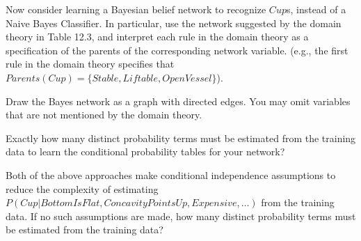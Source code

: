 \item 
Now consider learning a Bayesian belief network to recognize $Cup$s, instead
of a Naive Bayes Classifier.  In particular, use the network suggested by the
domain theory in Table 12.3, and interpret each rule in the domain theory as a
specification of the parents of the corresponding network variable.  (e.g.,
the first rule in the domain theory specifies that $Parents(Cup) = \{ Stable,
Liftable, OpenVessel \}$). 

Draw the Bayes network as a graph with directed edges.  You may omit variables
that are not mentioned by the domain theory.


Exactly how many distinct probability terms must be estimated from the
training data to learn the conditional probability tables for your network?


\item
Both of the above approaches make conditional independence assumptions to
reduce the complexity of estimating $P(Cup | BottomIsFlat, ConcavityPointsUp,
Expensive, \ldots)$ from the training data.  If no such assumptions are made,
how many distinct probability terms must be estimated from the training data?

\ei

\ee


